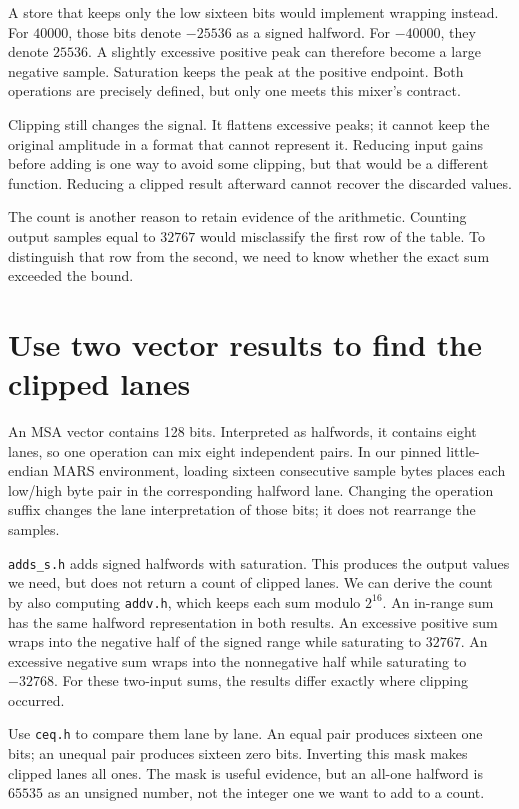 A store that keeps only the low sixteen bits would implement wrapping instead.
For $40000$, those bits denote $-25536$ as a signed halfword. For $-40000$,
they denote $25536$. A slightly excessive positive peak can therefore become a
large negative sample. Saturation keeps the peak at the positive endpoint.
Both operations are precisely defined, but only one meets this mixer's contract.

Clipping still changes the signal. It flattens excessive peaks; it cannot keep
the original amplitude in a format that cannot represent it. Reducing input gains
before adding is one way to avoid some clipping, but that would be a different
function. Reducing a clipped result afterward cannot recover the discarded values.

The count is another reason to retain evidence of the arithmetic. Counting output
samples equal to $32767$ would misclassify the first row of the table. To distinguish
that row from the second, we need to know whether the exact sum exceeded the bound.

\section{Use two vector results to find the clipped lanes}

An MSA vector contains 128 bits. Interpreted as halfwords, it contains eight lanes,
so one operation can mix eight independent pairs. In our pinned little-endian
MARS environment, loading sixteen consecutive sample bytes places each low/high
byte pair in the corresponding halfword lane. Changing the operation suffix
changes the lane interpretation of those bits; it does not rearrange the samples.

\texttt{adds\_s.h} adds signed halfwords with saturation. This produces the output
values we need, but does not return a count of clipped lanes. We can derive the
count by also computing \texttt{addv.h}, which keeps each sum modulo $2^{16}$.
An in-range sum has the same halfword representation in both results. An excessive
positive sum wraps into the negative half of the signed range while saturating to
$32767$. An excessive negative sum wraps into the nonnegative half while saturating
to $-32768$. For these two-input sums, the results differ exactly where clipping
occurred.

Use \texttt{ceq.h} to compare them lane by lane. An equal pair produces sixteen
one bits; an unequal pair produces sixteen zero bits. Inverting this mask makes
clipped lanes all ones. The mask is useful evidence, but an all-one halfword is
$65535$ as an unsigned number, not the integer one we want to add to a count.

